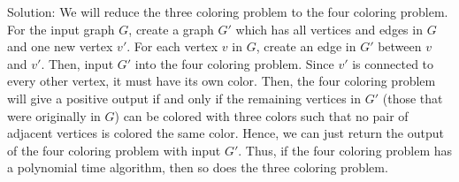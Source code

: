 \documentclass{article}
\begin{document}
\begin{enumerate}
\newline
\newline Solution: We will reduce the three coloring problem to the four coloring problem. For the input graph $G$, create a graph $G'$ which has all vertices and edges in $G$ and one new vertex $v'$. For each vertex $v$ in $G$, create an edge in $G'$ between $v$ and $v'$. Then, input $G'$ into the four coloring problem. Since $v'$ is connected to every other vertex, it must have its own color. Then, the four coloring problem will give a positive output if and only if the remaining vertices in $G'$ (those that were originally in $G$) can be colored with three colors such that no pair of adjacent vertices is colored the same color. Hence, we can just return the output of the four coloring problem with input $G'$. Thus, if the four coloring problem has a polynomial time algorithm, then so does the three coloring problem.

\end{enumerate}
\end{document}
